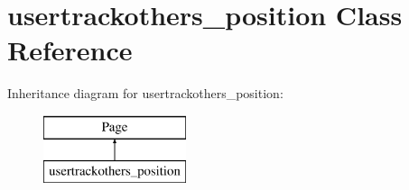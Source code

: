 \hypertarget{classusertrackothers__position}{\section{usertrackothers\-\_\-position Class Reference}
\label{classusertrackothers__position}
}
Inheritance diagram for usertrackothers\-\_\-position\-:\begin{figure}[H]
\begin{center}
\leavevmode
\includegraphics[height=2.000000cm]{classusertrackothers__position}
\end{center}
\end{figure}
